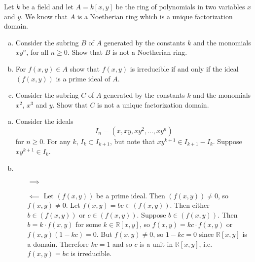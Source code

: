 \documentclass{article}
\newcounter{Problem}
\newenvironment{Problem}{\begin{Exercise}[name={Problem},
                                          counter={Problem}]}
                        {\end{Exercise}}
\begin{document}
\pagebreak

\begin{Problem}
  Let $k$ be a field and let $A = k[x, y]$ be the ring of polynomials in
  two variables $x$ and $y$. We know that $A$ is a Noetherian ring which
  is a unique factorization domain.
  \begin{enumerate}[(a)]
    \item{
      Consider the subring $B$ of $A$ generated by the constants $k$
      and the monomials $xy^n$, for all $n \geq 0$. Show that $B$ is
      not a Noetherian ring.
    }
    \item{
      For $f(x, y) \in A$ show that $f(x, y)$ is irreducible if and
      only if the ideal $(f(x,y))$ is a prime ideal of $A$.
    }
    \item{
      Consider the subring $C$ of $A$ generated by the constants $k$
      and the monomials $x^2$, $x^3$ and $y$. Show that $C$ is not a
      unique factorization domain.
    }
  \end{enumerate}
\end{Problem}

\begin{Answer}
  \begin{enumerate}[(a)]
    \item{
      Consider the ideals
      $$
      I_n = (x, xy, xy^2, \dots, xy^n)
      $$
      for $n \geq 0$. For any $k$, $I_k \subset I_{k+1}$, but note that
      $xy^{k+1} \in I_{k+1} - I_k$. Suppose $xy^{k+1} \in I_k$.
    }
    \item{
      \begin{itemize}
        \item[$\implies$]{
        }
        \item[$\impliedby$]{
          Let $(f(x,y))$ be a prime ideal. Then $(f(x,y)) \neq 0$, so
          $f(x,y) \neq 0$. Let $f(x,y) = bc \in (f(x,y))$.
          Then either $b \in (f(x,y))$ or $c
          \in (f(x,y))$. Suppose $b \in (f(x,y))$. Then
          $b = k \cdot f(x,y)$ for some $k \in \mathbb{R}[x, y]$, so
          $f(x, y) = k c \cdot f(x,y)$ or $f(x, y)(1 - kc) = 0$. But
          $f(x, y) \neq 0$, so $1 - kc = 0$ since $\mathbb{R}[x, y]$
          is a domain. Therefore $kc = 1$ and so $c$ is a unit in
          $\mathbb{R}[x,y]$, i.e. $f(x,y) = bc$ is irreducible.
        }
      \end{itemize}
    }
  \end{enumerate}
\end{Answer}

\pagebreak
\end{document}
